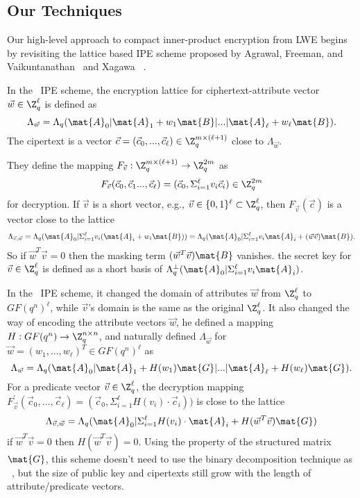 \subsection{Our Techniques}
Our high-level approach to compact inner-product encryption from LWE begins by revisiting the lattice based IPE scheme proposed by Agrawal, Freeman, and Vaikuntanathan~ \cite{AC:AgrFreVai11} and Xagawa~ \cite{PKC:Xagawa13}.\

In the~ \cite{AC:AgrFreVai11} IPE scheme, the encryption lattice for ciphertext-attribute vector $\vec{w} \in \Z^{\ell}_{q}$ is defined as
$$\Lambda_{\vec{w}}=\Lambda_{q}(\mat{A}_{0}|\mat{A}_{1}+w_{1}\mat{B}|...|\mat{A}_{\ell}+w_{\ell}\mat{B}).$$
The cipertext is a vector $\vec{c}=(\vec{c}_{0},...,\vec{c}_{\ell}) \in \Z^{m \times (\ell+1)}_{q}$ close to $\Lambda_{\vec{w}}$.\

They define the mapping $F_{\vec{v}}: \Z^{m \times (\ell+1)}_{q} \rightarrow \Z^{2m}_{q}$ as
$$ F_{\vec{v}}(\vec{c}_{0},\vec{c}_{1}...,\vec{c}_{\ell})=(\vec{c}_{0},\Sigma^{\ell}_{i=1}v_{i}\vec{c}_{i})\in \Z^{2m}_{q}$$
for decryption. If $\vec{v}$ is a short vector, e.g., $\vec{v}\in \{0,1\}^{\ell} \subset \Z^{\ell}_{q}$, then $F_{\vec{v}}(\vec{c})$ is a vector close to the lattice
$$ \Lambda_{\vec{v},\vec{w}}=\Lambda_{q}(\mat{A}_{0}|\Sigma^{\ell}_{i=1}v_{i}(\mat{A}_{i}+w_{i}\mat{B}))=\Lambda_{q}(\mat{A}_{0}|\Sigma^{\ell}_{i=1}v_{i}\mat{A}_{i}+(\vec{w}\vec{v})\mat{B}). $$
So if $\vec{w}^{T}\vec{v}=0$ then the masking term $(\vec{w}^{T}\vec{v})\mat{B}$ vanishes. the secret key for $\vec{v}\in \Z^{\ell}_{q}$ is defined as a short basis of $\Lambda^{\perp}_{q}(\mat{A}_{0}|\Sigma^{\ell}_{i=1}v_{i}\mat{A}_{i})$.\

In the~\cite{PKC:Xagawa13} IPE scheme, it changed the domain of attributes $\vec{w}$ from $\Z^{\ell}_{q}$ to $GF(q^{n})^{\ell}$, while $\vec{v}$'s domain is the same as the original $\Z^{\ell}_{q}$. It also changed the way of encoding the attribute vectors $\vec{w}$, he defined a mapping $H: GF(q^{n})\rightarrow \Z^{n\times n}_{q}$, and naturally defined $\Lambda_{\vec{w}}$ for $\vec{w}=(w_{1},...,w_{\ell})^{T}\in GF(q^{n})^{\ell}$ as
$$ \Lambda_{\vec{w}}=\Lambda_{q}(\mat{A}_{0}|\mat{A}_{1}+H(w_{1})\mat{G}|...|\mat{A}_{\ell}+H(w_{\ell})\mat{G}).$$
For a predicate vector $\vec{v}\in \Z^{\ell}_{q}$,  the decryption mapping $F^{'}_{\vec{v}}(\vec{c}_{0},...,\vec{c}_{\ell})=(\vec{c}_{0},\Sigma^{\ell}_{i=1}H(v_{i})\cdot \vec{c}_{i}))$ is close to the lattice
$$ \Lambda_{\vec{v},\vec{w}}=\Lambda_{q}(\mat{A}_{0}|\Sigma^{\ell}_{i=1}H(v_{i})\cdot \mat{A}_{i}+H(\vec{w}^{T}\vec{v})\mat{G}) $$
if $\vec{w}^{T}\vec{v}=0$ then $H(\vec{w}^{T}\vec{v})=0$. Using the property of the structured matrix $\mat{G}$, this scheme doesn't need to use the binary decomposition technique as ~\cite{AC:AgrFreVai11}, but the size of public key and cipertexts still grow with the length of attribute/predicate vectors.
